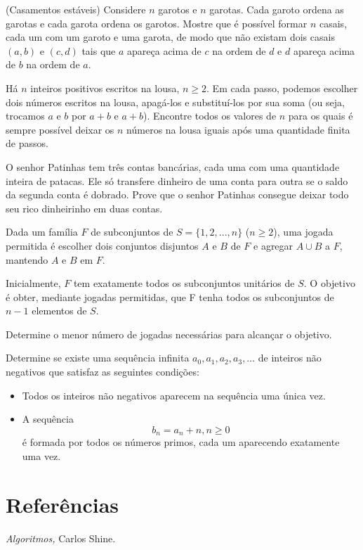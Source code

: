 \documentclass[10pt,a4paper]{article}
\begin{document}
	\begin{prob}(Casamentos estáveis)
		Considere $n$ garotos e $n$ garotas.
		Cada garoto ordena as garotas e cada garota ordena os garotos.
		Mostre que é possível formar $n$ casais, cada um com um garoto e uma garota, de modo que não existam dois casais $(a, b)$ e $(c, d)$ tais que $a$ apareça acima de $c$ na ordem de $d$ e $d$ apareça acima de $b$ na ordem de $a$.
	\end{prob}

	\begin{prob}
		Há $n$ inteiros positivos escritos na lousa, $n \ge 2$.
		Em cada passo, podemos escolher dois números escritos na lousa, apagá-los e substituí-los por sua soma (ou seja, trocamos $a$ e $b$ por $a + b$ e $a + b$).
		Encontre todos os valores de $n$ para os quais é sempre possível deixar os $n$ números na lousa iguais após uma quantidade finita de passos.
	\end{prob}

	\begin{prob}
		O senhor Patinhas tem três contas bancárias, cada uma com uma quantidade inteira de patacas.
		Ele só transfere dinheiro de uma conta para outra se o saldo da segunda conta é dobrado.
		Prove que o senhor Patinhas consegue deixar todo seu rico dinheirinho em duas contas.
	\end{prob}

	\begin{prob}
		Dada um família $F$ de subconjuntos de $S = \{1, 2, . . . , n\}$ ($n \ge 2$), uma jogada permitida é escolher dois conjuntos disjuntos $A$ e $B$ de $F$ e agregar $A \cup B$ a $F$, mantendo $A$ e $B$ em $F$.
		
		Inicialmente, $F$ tem exatamente todos os subconjuntos unitários de $S$. O objetivo é obter, mediante jogadas permitidas, que F tenha todos os subconjuntos de $n - 1$ elementos de $S$.

		Determine o menor número de jogadas necessárias para alcançar o objetivo.
	\end{prob}

	\begin{prob}
		Determine se existe uma sequência infinita $a_0, a_1, a_2, a_3, \dots$ de inteiros não negativos que satisfaz as seguintes condições:
		\begin{itemize}
			\item Todos os inteiros não negativos aparecem na sequência uma única vez.
			\item A sequência $$b_n = a_n + n, n \ge 0$$ é formada por todos os números primos, cada um aparecendo exatamente uma vez.
		\end{itemize}
	\end{prob}





	\newpage
	\section{Referências}
	\begin{enumerate}[label = { [\arabic*] }]
		\item \emph{Algoritmos,} Carlos Shine.
	\end{enumerate}
\end{document}
